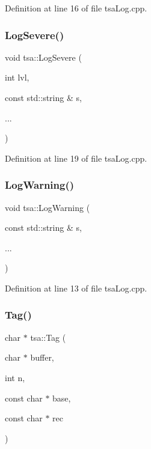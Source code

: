 Definition at line 16 of file tsa\+Log.\+cpp.

\mbox{\label{namespacetsa_aeff53394d3502127b84380cceb41cba8}} 
\subsubsection{\texorpdfstring{Log\+Severe()}{LogSevere()}\hspace{0.1cm}{\footnotesize\ttfamily [2/2]}}
{\footnotesize\ttfamily void tsa\+::\+Log\+Severe (\begin{DoxyParamCaption}\item[{int}]{lvl,  }\item[{const std\+::string \&}]{s,  }\item[{}]{... }\end{DoxyParamCaption})}



Definition at line 19 of file tsa\+Log.\+cpp.

\mbox{\label{namespacetsa_a91d266348bcf69ab00c97a253b0ec790}} 
\subsubsection{\texorpdfstring{Log\+Warning()}{LogWarning()}}
{\footnotesize\ttfamily void tsa\+::\+Log\+Warning (\begin{DoxyParamCaption}\item[{const std\+::string \&}]{s,  }\item[{}]{... }\end{DoxyParamCaption})}



Definition at line 13 of file tsa\+Log.\+cpp.

\mbox{\label{namespacetsa_afb13ed99dfd49fe21c248464155e8806}} 
\subsubsection{\texorpdfstring{Tag()}{Tag()}\hspace{0.1cm}{\footnotesize\ttfamily [1/3]}}
{\footnotesize\ttfamily char $\ast$ tsa\+::\+Tag (\begin{DoxyParamCaption}\item[{char $\ast$}]{buffer,  }\item[{int}]{n,  }\item[{const char $\ast$}]{base,  }\item[{const char $\ast$}]{rec }\end{DoxyParamCaption})}



